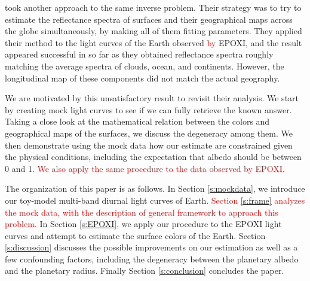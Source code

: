 \documentclass[iop,numberedappendix,apj]{emulateapj}
\def\edit#1{\textcolor{red}{#1}}
\begin{document}
\citet{Cowan2013} took another approach to the same inverse problem. 
Their strategy was to try to estimate the reflectance spectra of surfaces and their geographical maps across the globe simultaneously, by making all of them fitting parameters. 
They applied their method to the light curves of the Earth observed \edit{by} EPOXI, and the result appeared successful in so far as they obtained reflectance spectra roughly matching the average spectra of clouds, ocean, and continents. 
However, the longitudinal map of these components did not match the actual geography.  

We are motivated by this unsatisfactory result to revisit their analysis. 
We start by creating mock light curves to see if we can fully retrieve the known answer. 
Taking a close look at the mathematical relation between the colors and geographical maps of the surfaces, we discuss the degeneracy among them. 
We then demonstrate using the mock data how our estimate are constrained given the physical conditions, including the expectation that albedo should be between 0 and 1. 
\edit{We also apply the same procedure to the data observed by EPOXI. }

The organization of this paper is as follows. 
In Section \ref{s:mockdata}, we introduce our toy-model multi-band diurnal light curves of Earth. 
\edit{Section \ref{s:frame} analyzes the mock data, with the description of general framework to approach this problem. } 
In Section \ref{s:EPOXI}, we apply our procedure to the EPOXI light curves and attempt to estimate the surface colors of the Earth. 
Section \ref{s:discussion} discusses the possible improvements on our estimation as well as a few confounding factors, including the degeneracy between the planetary albedo and the planetary radius. 
Finally Section \ref{s:conclusion} concludes the paper. 
\end{document}
